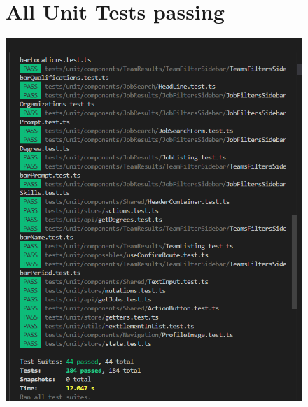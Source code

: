 \documentclass[ 4paper,11pt,openany]{book}
\begin{document}
\begin{figure}[htpb!] 
	\section{All Unit Tests passing}
	\includegraphics{allTestUnits.png}
\end{figure}
\end{document}
